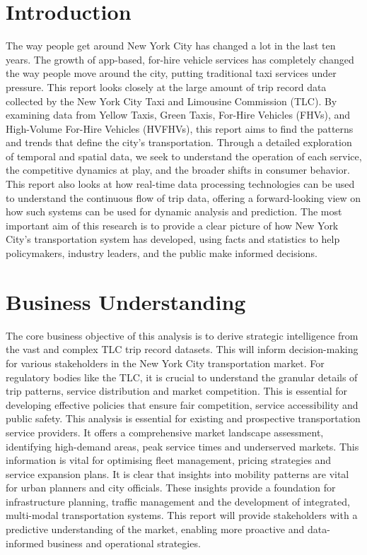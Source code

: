 \documentclass[conference]{IEEEtran}
\begin{document}
\section{Introduction}

The way people get around New York City has changed a lot in the last ten years. The growth of app-based, for-hire
vehicle services has completely changed the way people move around the city, putting traditional taxi services under
pressure. This report looks closely at the large amount of trip record data collected by the New York City Taxi and
Limousine Commission (TLC). By examining data from Yellow Taxis, Green Taxis, For-Hire Vehicles (FHVs), and High-Volume
For-Hire Vehicles (HVFHVs), this report aims to find the patterns and trends that define the city's transportation.
Through a detailed exploration of temporal and spatial data, we seek to understand the operation of
each service, the competitive dynamics at play, and the broader shifts in consumer behavior. This report also looks at
how real-time data processing technologies can be used to understand the continuous flow of trip data, offering a
forward-looking view on how such systems can be used for dynamic analysis and prediction. The most important aim of
this research is to provide a clear picture of how New York City's transportation system has developed, using facts and
statistics to help policymakers, industry leaders, and the public make informed decisions.

\section{Business Understanding}

The core business objective of this analysis is to derive strategic intelligence from the vast and complex TLC
trip record datasets. This will inform decision-making for various stakeholders in the New York City transportation
market. For regulatory bodies like the TLC, it is crucial to understand the granular details of trip patterns, service
distribution and market competition. This is essential for developing effective policies that ensure fair competition,
service accessibility and public safety. This analysis is essential for existing and prospective transportation service
providers. It offers a comprehensive market landscape assessment, identifying high-demand areas, peak service times and
underserved markets. This information is vital for optimising fleet management, pricing strategies and service expansion
plans. It is clear that insights into mobility patterns are vital for urban planners and city officials. These insights
provide a foundation for infrastructure planning, traffic management and the development of integrated, multi-modal
transportation systems. This report will provide stakeholders with a predictive understanding of the market, enabling
more proactive and data-informed business and operational strategies.
\end{document}
